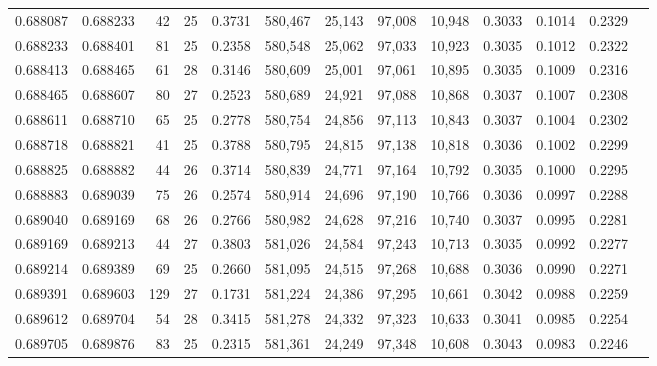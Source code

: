 \begin{tabular}{rrrrrrrrrrrrr}
0.688087 & 0.688233 &  42 &  25 &                                     0.3731 & 580,467 &  25,143 &  97,008 &  10,948 & 0.3033 & 0.1014 & 0.2329 \\
0.688233 & 0.688401 &  81 &  25 &                                     0.2358 & 580,548 &  25,062 &  97,033 &  10,923 & 0.3035 & 0.1012 & 0.2322 \\
0.688413 & 0.688465 &  61 &  28 &                                     0.3146 & 580,609 &  25,001 &  97,061 &  10,895 & 0.3035 & 0.1009 & 0.2316 \\
0.688465 & 0.688607 &  80 &  27 &                                     0.2523 & 580,689 &  24,921 &  97,088 &  10,868 & 0.3037 & 0.1007 & 0.2308 \\
0.688611 & 0.688710 &  65 &  25 &                                     0.2778 & 580,754 &  24,856 &  97,113 &  10,843 & 0.3037 & 0.1004 & 0.2302 \\
0.688718 & 0.688821 &  41 &  25 &                                     0.3788 & 580,795 &  24,815 &  97,138 &  10,818 & 0.3036 & 0.1002 & 0.2299 \\
0.688825 & 0.688882 &  44 &  26 &                                     0.3714 & 580,839 &  24,771 &  97,164 &  10,792 & 0.3035 & 0.1000 & 0.2295 \\
0.688883 & 0.689039 &  75 &  26 &                                     0.2574 & 580,914 &  24,696 &  97,190 &  10,766 & 0.3036 & 0.0997 & 0.2288 \\
0.689040 & 0.689169 &  68 &  26 &                                     0.2766 & 580,982 &  24,628 &  97,216 &  10,740 & 0.3037 & 0.0995 & 0.2281 \\
0.689169 & 0.689213 &  44 &  27 &                                     0.3803 & 581,026 &  24,584 &  97,243 &  10,713 & 0.3035 & 0.0992 & 0.2277 \\
0.689214 & 0.689389 &  69 &  25 &                                     0.2660 & 581,095 &  24,515 &  97,268 &  10,688 & 0.3036 & 0.0990 & 0.2271 \\
0.689391 & 0.689603 & 129 &  27 &                                     0.1731 & 581,224 &  24,386 &  97,295 &  10,661 & 0.3042 & 0.0988 & 0.2259 \\
0.689612 & 0.689704 &  54 &  28 &                                     0.3415 & 581,278 &  24,332 &  97,323 &  10,633 & 0.3041 & 0.0985 & 0.2254 \\
0.689705 & 0.689876 &  83 &  25 &                                     0.2315 & 581,361 &  24,249 &  97,348 &  10,608 & 0.3043 & 0.0983 & 0.2246 \\

\end{tabular}

